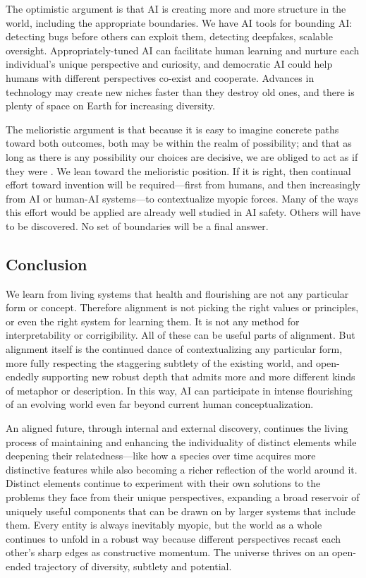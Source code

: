\documentclass[11pt]{article}
\begin{document}
The optimistic argument is that AI is creating more and more structure in the world, including the appropriate boundaries. We have AI tools for bounding AI: detecting bugs before others can exploit them, detecting deepfakes, scalable oversight. Appropriately-tuned AI can facilitate human learning and nurture each individual's unique perspective and curiosity, and democratic AI could help humans with different perspectives co-exist and cooperate. Advances in technology may create new niches faster than they destroy old ones, and there is plenty of space on Earth for increasing diversity.

The melioristic argument is that because it is easy to imagine concrete paths toward both outcomes, both may be within the realm of possibility; and that as long as there is any possibility our choices are decisive, we are obliged to act as if they were \citep{ord2020precipice}. We lean toward the melioristic position. If it is right, then continual effort toward invention will be required---first from humans, and then increasingly from AI or human-AI systems---to contextualize myopic forces. Many of the ways this effort would be applied are already well studied in AI safety. Others will have to be discovered. No set of boundaries will be a final answer.


\subsection{Conclusion}

We learn from living systems that health and flourishing are not any particular form or concept. Therefore alignment is not picking the right values or principles, or even the right system for learning them. It is not any method for interpretability or corrigibility. All of these can be useful parts of alignment. But alignment itself is the continued dance of contextualizing any particular form, more fully respecting the staggering subtlety of the existing world, and open-endedly supporting new robust depth that admits more and more different kinds of metaphor or description. In this way, AI can participate in intense flourishing of an evolving world even far beyond current human conceptualization.

An aligned future, through internal and external discovery, continues the living process of maintaining and enhancing the individuality of distinct elements while deepening their relatedness---like how a species over time acquires more distinctive features while also becoming a richer reflection of the world around it. Distinct elements continue to experiment with their own solutions to the problems they face from their unique perspectives, expanding a broad reservoir of uniquely useful components that can be drawn on by larger systems that include them. Every entity is always inevitably myopic, but the world as a whole continues to unfold in a robust way because different perspectives recast each other's sharp edges as constructive momentum. The universe thrives on an open-ended trajectory of diversity, subtlety and potential.
\end{document}
